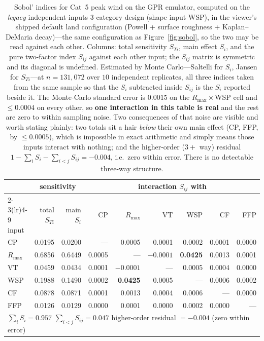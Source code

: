\documentclass[11pt]{article}
\begin{document}
\begin{table}[H]
\centering\footnotesize
\setlength{\tabcolsep}{5pt}
\caption{Sobol' indices for Cat~5 peak wind on the GPR emulator, computed on the
\emph{legacy} independent-inputs 3-category design (shape input WSP), in the viewer's
shipped default land configuration (Powell + surface roughness + Kaplan--DeMaria
decay)---the same configuration as Figure~\ref{fig:sobol}, so the two may be read
against each other. Columns: total sensitivity $S_{Ti}$, main effect $S_i$, and the
pure two-factor index $S_{ij}$ against each other input; the $S_{ij}$ matrix is
symmetric and its diagonal is undefined. Estimated by Monte Carlo---Saltelli for
$S_i$, Jansen for $S_{Ti}$---at $n=131{,}072$ over $10$ independent replicates, all
three indices taken from the same sample so that the $S_i$ subtracted inside $S_{ij}$
is the $S_i$ reported beside it. The Monte-Carlo standard error is $0.0015$ on the
$R_{\max}\times$WSP cell and $\le 0.0004$ on every other, so \textbf{one interaction
in this table is real} and the rest are zero to within sampling noise. Two
consequences of that noise are visible and worth stating plainly: two totals sit a
hair \emph{below} their own main effect (CP, FFP, by $\le 0.0005$), which is
impossible in exact arithmetic and simply means those inputs interact with nothing;
and the higher-order ($3+$ way) residual $1-\sum_i S_i-\sum_{i<j}S_{ij} = -0.004$,
i.e.\ zero within error. There is no detectable three-way structure.}
\label{tab:sobol}
\begin{tabular}{lrrrrrrrr}
\toprule
 & \multicolumn{2}{c}{sensitivity} & \multicolumn{6}{c}{interaction $S_{ij}$ with}\\
\cmidrule(lr){2-3}\cmidrule(lr){4-9}
input & total $S_{Ti}$ & main $S_i$ & CP & $R_{\max}$ & VT & WSP & CF & FFP\\
\midrule
CP        & 0.0195 & 0.0200 & --- & 0.0005 & 0.0001 & 0.0002 & 0.0001 & 0.0000\\
$R_{\max}$& 0.6856 & 0.6449 & 0.0005 & --- & $-0.0001$ & \textbf{0.0425} & 0.0013 & 0.0001\\
VT        & 0.0459 & 0.0434 & 0.0001 & $-0.0001$ & --- & 0.0005 & 0.0004 & 0.0000\\
WSP       & 0.1988 & 0.1490 & 0.0002 & \textbf{0.0425} & 0.0005 & --- & 0.0006 & 0.0002\\
CF        & 0.0878 & 0.0871 & 0.0001 & 0.0013 & 0.0004 & 0.0006 & --- & 0.0000\\
FFP       & 0.0126 & 0.0129 & 0.0000 & 0.0001 & 0.0000 & 0.0002 & 0.0000 & ---\\
\midrule
\multicolumn{9}{l}{\footnotesize $\sum_i S_i = 0.957$ \hfill $\sum_{i<j} S_{ij} = 0.047$
\hfill higher-order residual $=-0.004$ (zero within error) \hfill}\\
\bottomrule
\end{tabular}
\end{table}
\end{document}
